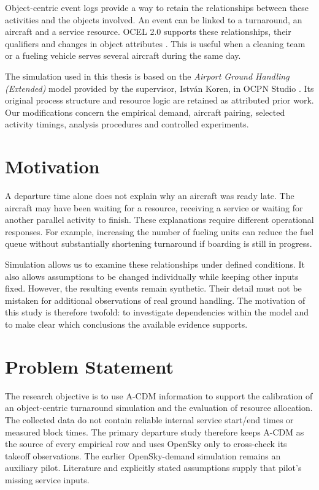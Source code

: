 Object-centric event logs provide a way to retain the relationships between these activities and the objects involved. An event can be linked to a turnaround, an aircraft and a service resource. OCEL 2.0 supports these relationships, their qualifiers and changes in object attributes \cite{ocel2}. This is useful when a cleaning team or a fueling vehicle serves several aircraft during the same day.

The simulation used in this thesis is based on the \emph{Airport Ground Handling (Extended)} model provided by the supervisor, Istv\'an Koren, in OCPN Studio \cite{ocpn_studio}. Its original process structure and resource logic are retained as attributed prior work. Our modifications concern the empirical demand, aircraft pairing, selected activity timings, analysis procedures and controlled experiments.

\section{Motivation}
A departure time alone does not explain why an aircraft was ready late. The aircraft may have been waiting for a resource, receiving a service or waiting for another parallel activity to finish. These explanations require different operational responses. For example, increasing the number of fueling units can reduce the fuel queue without substantially shortening turnaround if boarding is still in progress.

Simulation allows us to examine these relationships under defined conditions. It also allows assumptions to be changed individually while keeping other inputs fixed. However, the resulting events remain synthetic. Their detail must not be mistaken for additional observations of real ground handling. The motivation of this study is therefore twofold: to investigate dependencies within the model and to make clear which conclusions the available evidence supports.

\section{Problem Statement}
The research objective is to use A-CDM information to support the calibration of an object-centric turnaround simulation and the evaluation of resource allocation. The collected data do not contain reliable internal service start/end times or measured block times. The primary departure study therefore keeps A-CDM as the source of every empirical row and uses OpenSky only to cross-check its takeoff observations. The earlier OpenSky-demand simulation remains an auxiliary pilot. Literature and explicitly stated assumptions supply that pilot's missing service inputs.

